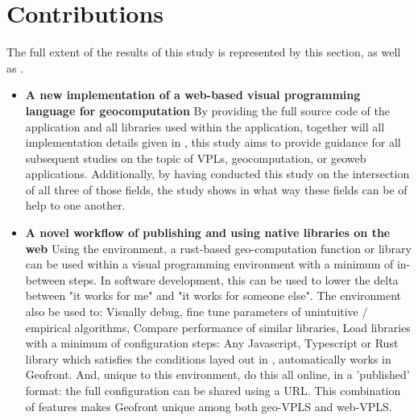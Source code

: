 \section{Contributions}
\label{sec:contribution}
The full extent of the results of this study is represented by this section, as well as .

\begin{itemize}[-]
  \item \textbf{A new implementation of a web-based visual programming language for geocomputation}
    \subitem By providing the full source code of the application and all libraries used within the application, together will all implementation details given in , this study aims to provide guidance for all subsequent studies on the topic of VPLs, geocomputation, or geoweb applications. 
    \subitem Additionally, by having conducted this study on the intersection of all three of those fields, the study shows in what way these fields can be of help to one another. 





  \item \textbf{A novel workflow of publishing and using native libraries on the web}
    \subitem Using the environment, a rust-based geo-computation function or library can be used within a visual programming environment with a minimum of in-between steps.
    In software development, this can be used to lower the delta between "it works for me" and "it works for someone else".
    The environment also be used to:
    \subitem Visually debug, 
    \subitem fine tune parameters of unintuitive / empirical algorithms, 
    \subitem Compare performance of similar libraries,
    \subitem Load libraries with a minimum of configuration steps: Any Javascript, Typescript or Rust library which satisfies the conditions layed out in , automatically works in Geofront.
    \subitem And, unique to this environment, do this all online, in a 'published' format: the full configuration can be shared using a URL.
    \subitem This combination of features makes Geofront unique among both geo-VPLS and web-VPLS. 
    

\end{itemize}

